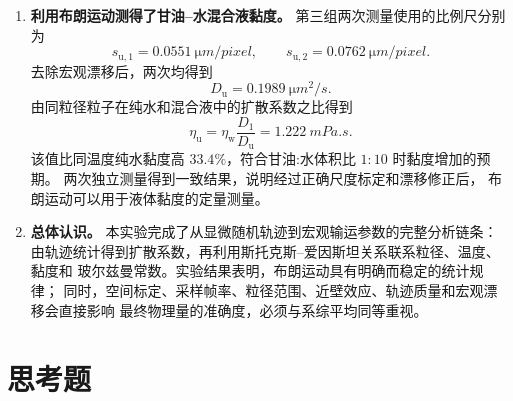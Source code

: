 \documentclass[11pt]{article}
\begin{document}
\begin{enumerate}
    \item \textbf{利用布朗运动测得了甘油--水混合液黏度。}
    第三组两次测量使用的比例尺分别为
    \begin{equation}
        s_{\mathrm{u},1}=\SI{0.0551}{\micro m/pixel},\qquad
        s_{\mathrm{u},2}=\SI{0.0762}{\micro m/pixel}.
    \end{equation}
    去除宏观漂移后，两次均得到
    \begin{equation}
        D_{\mathrm u}=\SI{0.1989}{\micro m^2/s}.
    \end{equation}
    由同粒径粒子在纯水和混合液中的扩散系数之比得到
    \begin{equation}
        \eta_{\mathrm u}
        =\eta_{\mathrm w}\frac{D_1}{D_{\mathrm u}}
        =\SI{1.222}{mPa.s}.
    \end{equation}
    该值比同温度纯水黏度高 $33.4\%$，符合甘油:水体积比 $1:10$ 时黏度增加的预期。
    两次独立测量得到一致结果，说明经过正确尺度标定和漂移修正后，
    布朗运动可以用于液体黏度的定量测量。

    \item \textbf{总体认识。}
    本实验完成了从显微随机轨迹到宏观输运参数的完整分析链条：
    由轨迹统计得到扩散系数，再利用斯托克斯--爱因斯坦关系联系粒径、温度、黏度和
    玻尔兹曼常数。实验结果表明，布朗运动具有明确而稳定的统计规律；
    同时，空间标定、采样帧率、粒径范围、近壁效应、轨迹质量和宏观漂移会直接影响
    最终物理量的准确度，必须与系综平均同等重视。
\end{enumerate}

\section{思考题}
\end{document}
